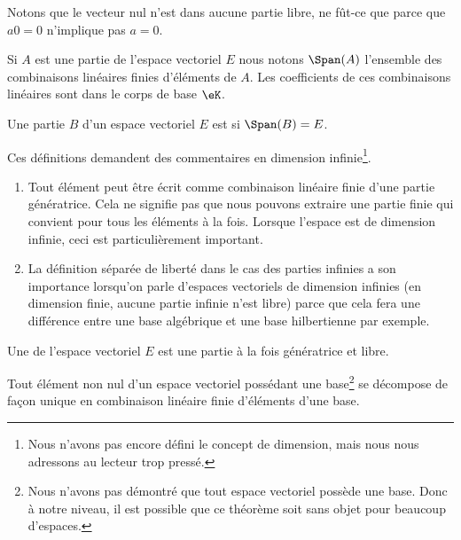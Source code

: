 \begin{remark}
    Notons que le vecteur nul n'est dans aucune partie libre, ne fût-ce que parce que \( a0=0\) n'implique pas \( a=0\).
\end{remark}

Si \( A\) est une partie de l'espace vectoriel \( E\) nous notons \( \Span(A)\) l'ensemble des combinaisons linéaires finies d'éléments de \( A\). Les coefficients de ces combinaisons linéaires sont dans le corps de base \( \eK\).

\begin{definition}
    Une partie $B$ d'un espace vectoriel \( E\) est  si \( \Span(B)=E\).
\end{definition}

\begin{remark}
    Ces définitions demandent des commentaires en dimension infinie\footnote{Nous n'avons pas encore défini le concept de dimension, mais nous nous adressons au lecteur trop pressé.}.

    \begin{enumerate}
        \item
    Tout élément peut être écrit comme combinaison linéaire finie d'une partie génératrice. Cela ne signifie pas que nous pouvons extraire une partie finie qui convient pour tous les éléments à la fois. Lorsque l'espace est de dimension infinie, ceci est particulièrement important.
\item
    La définition séparée de liberté dans le cas des parties infinies a son importance lorsqu'on parle d'espaces vectoriels de dimension infinies (en dimension finie, aucune partie infinie n'est libre) parce que cela fera une différence entre une base algébrique et une base hilbertienne par exemple.
    \end{enumerate}
\end{remark}

\begin{definition}[Base]        \label{DEFooNGDSooEDAwTh}
    Une  de l'espace vectoriel \( E\) est une partie à la fois génératrice et libre.
\end{definition}

\begin{proposition}      \label{PROPooEIQIooXfWDDV}
    Tout élément non nul d'un espace vectoriel possédant une base\footnote{Nous n'avons pas démontré que tout espace vectoriel possède une base. Donc à notre niveau, il est possible que ce théorème soit sans objet pour beaucoup d'espaces.} se décompose de façon unique en combinaison linéaire finie d'éléments d'une base.
\end{proposition}

